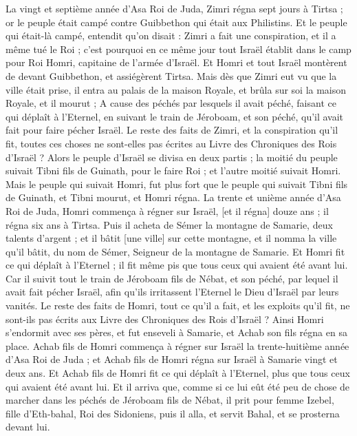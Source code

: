 \begin{multicols}{2}
La vingt et septième année d'Asa Roi de Juda, Zimri régna sept jours à Tirtsa ; or le peuple était campé contre Guibbethon qui était aux Philistins.
Et le peuple qui était-là campé, entendit qu'on disait : Zimri a fait une conspiration, et il a même tué le Roi ; c'est pourquoi en ce même jour tout Israël établit dans le camp pour Roi Homri, capitaine de l'armée d'Israël.
Et Homri et tout Israël montèrent de devant Guibbethon, et assiégèrent Tirtsa.
Mais dès que Zimri eut vu que la ville était prise, il entra au palais de la maison Royale, et brûla sur soi la maison Royale, et il mourut ;
A cause des péchés par lesquels il avait péché, faisant ce qui déplaît à l'Eternel, en suivant le train de Jéroboam, et son péché, qu'il avait fait pour faire pécher Israël.
Le reste des faits de Zimri, et la conspiration qu'il fit, toutes ces choses ne sont-elles pas écrites au Livre des Chroniques des Rois d'Israël ?
Alors le peuple d'Israël se divisa en deux partis ; la moitié du peuple suivait Tibni fils de Guinath, pour le faire Roi ; et l'autre moitié suivait Homri.
Mais le peuple qui suivait Homri, fut plus fort que le peuple qui suivait Tibni fils de Guinath, et Tibni mourut, et Homri régna.
La trente et unième année d'Asa Roi de Juda, Homri commença à régner sur Israël, [et il régna] douze ans ; il régna six ans à Tirtsa.
Puis il acheta de Sémer la montagne de Samarie, deux talents d'argent ; et il bâtit [une ville] sur cette montagne, et il nomma la ville qu'il bâtit, du nom de Sémer, Seigneur de la montagne de Samarie.
Et Homri fit ce qui déplaît à l'Eternel ; il fit même pis que tous ceux qui avaient été avant lui.
Car il suivit tout le train de Jéroboam fils de Nébat, et son péché, par lequel il avait fait pécher Israël, afin qu'ils irritassent l'Eternel le Dieu d'Israël par leurs vanités.
Le reste des faits de Homri, tout ce qu'il a fait, et les exploits qu'il fit, ne sont-ils pas écrits aux Livre des Chroniques des Rois d'Israël ?
Ainsi Homri s'endormit avec ses pères, et fut enseveli à Samarie, et Achab son fils régna en sa place.
Achab fils de Homri commença à régner sur Israël la trente-huitième année d'Asa Roi de Juda ; et Achab fils de Homri régna sur Israël à Samarie vingt et deux ans.
Et Achab fils de Homri fit ce qui déplaît à l'Eternel, plus que tous ceux qui avaient été avant lui.
Et il arriva que, comme si ce lui eût été peu de chose de marcher dans les péchés de Jéroboam fils de Nébat, il prit pour femme Izebel, fille d'Eth-bahal, Roi des Sidoniens, puis il alla, et servit Bahal, et se prosterna devant lui.

\end{multicols}
